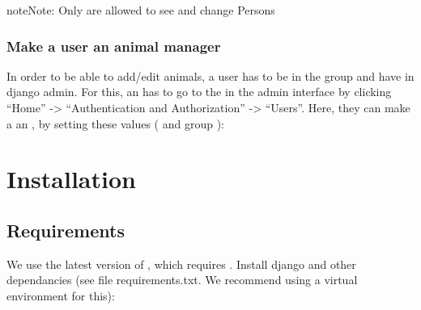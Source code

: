 \documentclass[letterpaper,10pt,openany,oneside,english]{sphinxmanual}
\begin{document}
\noindent{}

\begin{sphinxadmonition}{note}{Note:}
Only  are allowed to see and change Persons
\end{sphinxadmonition}


\subsection{Make a user an animal manager}
\label{\detokenize{index:make-a-user-an-animal-manager}}
In order to be able to add/edit animals, a user has to be in the group  and have
 in django admin. For this, an  has to go to the  in the admin interface by clicking “Home” -\textgreater{} “Authentication and
Authorization” -\textgreater{} “Users”. Here, they can make a  an , by setting these values (
and group ):

\noindent{}


\chapter{Installation}
\label{\detokenize{index:installation}}

\section{Requirements}
\label{\detokenize{index:requirements}}
We use the latest version of , which requires .
Install django and other dependancies (see file requirements.txt. We recommend using a virtual environment for this):

%
\begin{sphinxVerbatim}[commandchars=\\\{\}]
   
 
   
\end{sphinxVerbatim}
\end{document}
